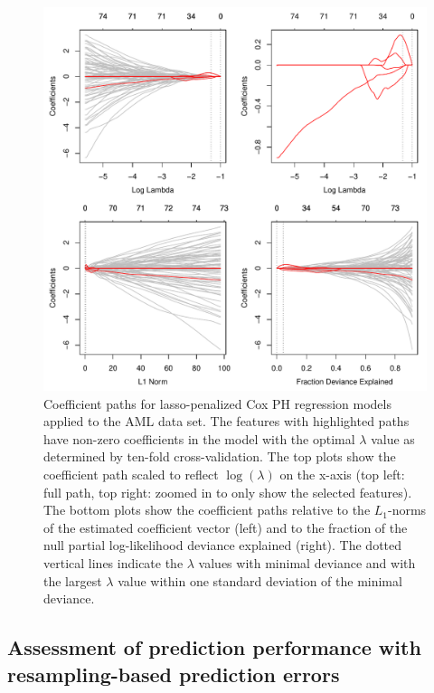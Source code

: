 \documentclass[nojss]{jss}
\begin{document}
\begin{figure}[H]
\begin{center}
\includegraphics{c060_vignette-glmnet4}
\end{center}
\caption{\label{fig:coefpath}Coefficient paths for lasso-penalized Cox PH regression models applied to the AML data set. The features with highlighted paths have non-zero coefficients in the model with the optimal $\lambda$ value as determined by ten-fold cross-validation. %
The top plots show the coefficient path scaled to reflect $\log(\lambda)$ on the x-axis (top left: full path, top right: zoomed in to only show the selected features). The bottom plots show the coefficient paths relative to the $L_1$-norms of the estimated coefficient vector (left) and to the fraction of the null partial log-likelihood deviance explained (right).
The dotted vertical lines indicate the $\lambda$ values with minimal deviance and with the largest $\lambda$ value within one standard deviation of the minimal deviance.}
\end{figure}

\subsection{Assessment of prediction performance with resampling-based prediction errors}
\label{pec}
\end{document}

